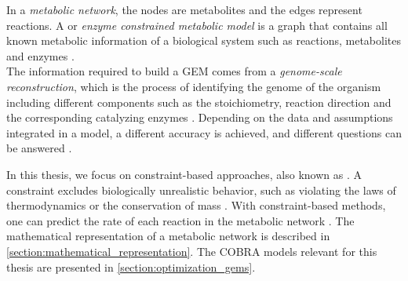 In a \textit{metabolic network}, the nodes are metabolites %
and the edges represent reactions. 
A  or \textit{enzyme constrained metabolic model} is a graph that contains all known metabolic information of a biological system such as reactions, metabolites and enzymes \cite{GEMs}.\\ 
The information required to build a GEM comes from a \textit{genome-scale reconstruction}, which is the process of identifying the genome of the organism including different components such as the stoichiometry, reaction direction and the corresponding catalyzing enzymes \cite{fba_applications_and_challenges} . 
Depending on the data and assumptions integrated in a model, a different accuracy is achieved, and different questions can be answered \cite{fba_applications_and_challenges}. 

In this thesis, we focus on constraint-based approaches, also known as . A constraint excludes biologically unrealistic behavior, such as violating the laws of thermodynamics or the conservation of mass \cite{intro_computational_systems_biology}.
With constraint-based methods, one can predict the 
rate of each reaction in the metabolic network \cite{intro_computational_systems_biology}.
The mathematical representation of a metabolic network is described in \cref{section:mathematical_representation}.
The COBRA models relevant for this thesis are presented in \cref{section:optimization_gems}.

